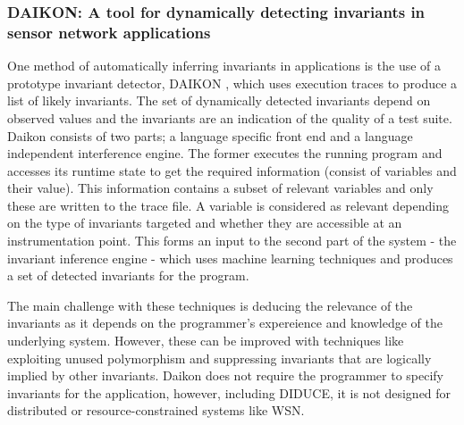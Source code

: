 \subsubsection*{DAIKON: A tool for dynamically detecting invariants in sensor network applications}

One method of automatically inferring invariants in applications is the use of a prototype invariant detector, DAIKON \cite{daikon}, which uses execution traces to produce a list of likely invariants. The set of dynamically detected invariants depend on observed values and the invariants are an indication of the quality of a test suite. Daikon consists of two parts; a language specific front end and a language independent interference engine. The former executes the running program and accesses its runtime state to get the required information (consist of variables and their value). This information contains a subset of relevant variables and only these are written to the trace file. A variable is considered as relevant depending on the type of invariants targeted and whether they are accessible at an instrumentation point. This forms an input to the second part of the system - the invariant inference engine - which uses machine learning techniques and produces a set of detected invariants for the program.

The main challenge with these techniques is deducing the relevance of the invariants as it depends on the programmer's expereience and knowledge of the underlying system. However, these can be improved with techniques like exploiting unused polymorphism and suppressing invariants that are logically implied by other invariants. Daikon does not require the programmer to specify invariants for the application, however, including DIDUCE, it is not designed for distributed or resource-constrained systems like WSN.


